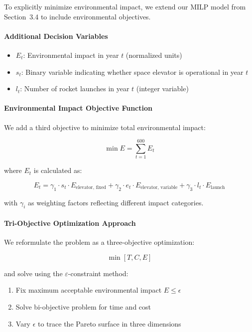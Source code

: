 \documentclass{mcmthesis}
\begin{document}
To explicitly minimize environmental impact, we extend our MILP model from Section~3.4 to include environmental objectives.

\paragraph{Additional Decision Variables}
\begin{itemize}
    \item \(E_t\): Environmental impact in year \(t\) (normalized units)
    \item \(s_t\): Binary variable indicating whether space elevator is operational in year \(t\)
    \item \(l_t\): Number of rocket launches in year \(t\) (integer variable)
\end{itemize}

\paragraph{Environmental Impact Objective Function}

We add a third objective to minimize total environmental impact:

\[
    \min E = \sum_{t=1}^{600} E_t
\]

where \(E_t\) is calculated as:

\[
    E_t = \gamma_1 \cdot s_t \cdot E_{\text{elevator, fixed}} + \gamma_2 \cdot e_t \cdot E_{\text{elevator, variable}} + \gamma_3 \cdot l_t \cdot E_{\text{launch}}
\]

with \(\gamma_i\) as weighting factors reflecting different impact categories.

\paragraph{Tri-Objective Optimization Approach}

We reformulate the problem as a three-objective optimization:

\[
    \min \left[ T, C, E \right]
\]

and solve using the $\varepsilon $-constraint method:

\begin{enumerate}
    \item Fix maximum acceptable environmental impact \(E \leq \epsilon\)
    \item Solve bi-objective problem for time and cost
    \item Vary \(\epsilon\) to trace the Pareto surface in three dimensions
\end{enumerate}
\end{document}
